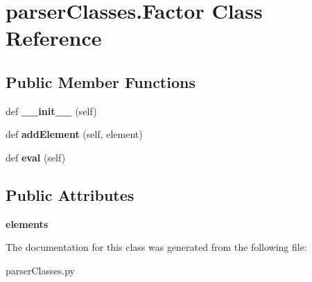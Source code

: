 \hypertarget{classparser_classes_1_1_factor}{}\section{parser\+Classes.\+Factor Class Reference}
\label{classparser_classes_1_1_factor}
\subsection*{Public Member Functions}
\begin{DoxyCompactItemize}
\item 
def {\bfseries \+\_\+\+\_\+init\+\_\+\+\_\+} (self)\hypertarget{classparser_classes_1_1_factor_a50cc8e66fcea86b531bc0e490ded63f2}{}\label{classparser_classes_1_1_factor_a50cc8e66fcea86b531bc0e490ded63f2}

\item 
def {\bfseries add\+Element} (self, element)\hypertarget{classparser_classes_1_1_factor_ad5d74ecd0f9ea5bf50e375cda5f57964}{}\label{classparser_classes_1_1_factor_ad5d74ecd0f9ea5bf50e375cda5f57964}

\item 
def {\bfseries eval} (self)\hypertarget{classparser_classes_1_1_factor_a5d9064846ca5c7367ab0b0bcfb200774}{}\label{classparser_classes_1_1_factor_a5d9064846ca5c7367ab0b0bcfb200774}

\end{DoxyCompactItemize}
\subsection*{Public Attributes}
\begin{DoxyCompactItemize}
\item 
{\bfseries elements}\hypertarget{classparser_classes_1_1_factor_ad5f90e3a7a1ebaa63f456d499e4d05f5}{}\label{classparser_classes_1_1_factor_ad5f90e3a7a1ebaa63f456d499e4d05f5}

\end{DoxyCompactItemize}


The documentation for this class was generated from the following file\+:\begin{DoxyCompactItemize}
\item 
parser\+Classes.\+py\end{DoxyCompactItemize}
